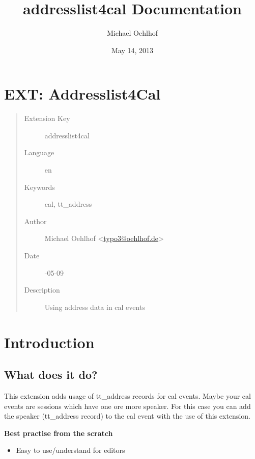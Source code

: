 \documentclass[a4paper,10pt,english]{sphinxtypo3manual}
\title{addresslist4cal Documentation}
\date{May 14, 2013}
\author{Michael Oehlhof}
\begin{document}
\maketitle
\tableofcontents
{}\label{index::doc}



\chapter{EXT: Addresslist4Cal}
\label{index:ext-addresslist4cal}\label{index:welcome-to-addresslist4cal-s-documentation}\begin{quote}\begin{description}
\item[{Extension Key}] \leavevmode
addresslist4cal

\item[{Language}] \leavevmode
en

\item[{Keywords}] \leavevmode
cal, tt\_address

\item[{Author}] \leavevmode
Michael Oehlhof \textless{}\href{mailto:typo3@oehlhof.de}{typo3@oehlhof.de}\textgreater{}

\item[{Date}] -05-09

\item[{Description}] \leavevmode
Using address data in cal events

\end{description}\end{quote}


\chapter{Introduction}
\label{index:introduction}

\section{What does it do?}
\label{index:what-does-it-do}
This extension adds usage of tt\_address records for cal events.
Maybe your cal events are sessions which have one ore more speaker.
For this case you can add the speaker (tt\_address record) to the cal event
with the use of this extension.

\textbf{Best practise from the scratch}
\begin{itemize}
\item {} 
Easy to use/understand for editors

\end{itemize}
\end{document}
